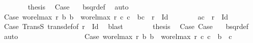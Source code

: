 \begin{isabellebody}
\ \ \ \ \ \ \isamarkupfalse%
\ {\isacharquery}{\kern0pt}thesis\ \isamarkupfalse%
\ Case{}\ {}\ \isamarkupfalse%
\ bsqr{\isacharunderscore}{\kern0pt}def\ \isamarkupfalse%
\ auto\isanewline
\ \ \ \ \ \isacommand{{\isacharbraceright}{\kern0pt}}\isamarkupfalse%
\isanewline
\ \ \ \ \ \isamarkupfalse%
\isanewline
\ \ \ \ \ \isacommand{{\isacharbraceleft}{\kern0pt}}\isamarkupfalse%
\isamarkupfalse%
\ Case{}{}{\isacharcolon}{\kern0pt}\ {\isachardoublequoteopen}wo{\isacharunderscore}{\kern0pt}rel{\isachardot}{\kern0pt}max{}\ r\ b{}\ b{}\ {\isacharequal}{\kern0pt}\ wo{\isacharunderscore}{\kern0pt}rel{\isachardot}{\kern0pt}max{}\ r\ c{}\ c{}\ {\isasymand}\ {\isacharparenleft}{\kern0pt}b{}{\isacharcomma}{\kern0pt}c{}{\isacharparenright}{\kern0pt}\ {\isasymin}\ r\ {\isacharminus}{\kern0pt}\ Id{\isachardoublequoteclose}\isanewline
\ \ \ \ \ \ \isamarkupfalse%
\ {\isachardoublequoteopen}{\isacharparenleft}{\kern0pt}a{}{\isacharcomma}{\kern0pt}c{}{\isacharparenright}{\kern0pt}\ {\isasymin}\ r\ {\isacharminus}{\kern0pt}\ Id{\isachardoublequoteclose}\isanewline
\ \ \ \ \ \ \isamarkupfalse%
\ Case{}\ TransS\ trans{\isacharunderscore}{\kern0pt}def{\isacharbrackleft}{\kern0pt}of\ {\isachardoublequoteopen}r\ {\isacharminus}{\kern0pt}\ Id{\isachardoublequoteclose}{\isacharbrackright}{\kern0pt}\ \isamarkupfalse%
\ blast\isanewline
\ \ \ \ \ \ \isamarkupfalse%
\ {\isacharquery}{\kern0pt}thesis\ \isamarkupfalse%
\ Case{}\ Case{}{}\ {}\ \isamarkupfalse%
\ bsqr{\isacharunderscore}{\kern0pt}def\ \isamarkupfalse%
\ auto\isanewline
\ \ \ \ \ \isacommand{{\isacharbraceright}{\kern0pt}}\isamarkupfalse%
\isanewline
\ \ \ \ \ \isamarkupfalse%
\isanewline
\ \ \ \ \ \isacommand{{\isacharbraceleft}{\kern0pt}}\isamarkupfalse%
\isamarkupfalse%
\ Case{}{}{\isacharcolon}{\kern0pt}\ {\isachardoublequoteopen}wo{\isacharunderscore}{\kern0pt}rel{\isachardot}{\kern0pt}max{}\ r\ b{}\ b{}\ {\isacharequal}{\kern0pt}\ wo{\isacharunderscore}{\kern0pt}rel{\isachardot}{\kern0pt}max{}\ r\ c{}\ c{}\ {\isasymand}\ b{}\ {\isacharequal}{\kern0pt}\ c{}{\isachardoublequoteclose}\isanewline

\end{isabellebody}
